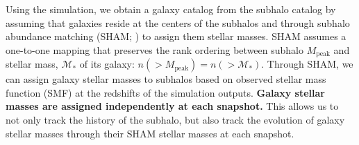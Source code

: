 \documentclass[iop,apj,tighten,twocolappendix,numberedappendix]{emulateapj}
\begin{document}
Using the \cite{Wetzel:2013aa} simulation, we obtain a galaxy 
catalog from the subhalo catalog by assuming that galaxies 
reside at the centers of the subhalos and through subhalo abundance matching 
(SHAM; \citealt{Vale:2006aa, Conroy:2006aa, Yang:2009aa, Wetzel:2012aa, 
Leja:2013aa, Wetzel:2013aa, Wetzel:2014aa}) to assign them stellar masses. 
SHAM assumes a one-to-one mapping that preserves the rank 
ordering between subhalo $M_\mathrm{peak}$ and stellar mass, $\mathcal{M}_*$ 
of its galaxy: $n(>M_\mathrm{peak}) = n(> \mathcal{M}_*)$. Through SHAM, we can 
assign galaxy stellar masses to subhalos based on observed stellar mass function 
(SMF) at the redshifts of the simulation outputs. 
{\color{red} \bf Galaxy stellar masses are assigned independently at each snapshot.}
This allows us to not only track the history 
of the subhalo, but also track the evolution of galaxy stellar masses through 
their SHAM stellar masses at each snapshot.
\end{document}
